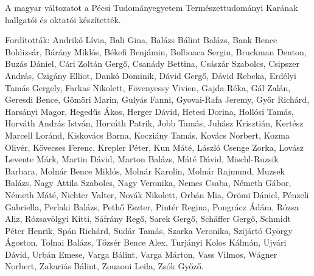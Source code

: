{
A magyar változatot a Pécsi Tudományegyetem Természettudományi Karának hallgatói és oktatói készítették.

Fordították:
Andrikó Lívia,
Bali Gina, Balázs Bálint Balázs, Bank Bence Boldizsár, Bárány Miklós,
Békefi Benjámin, Bolboaca Sergiu, Bruckman Denton, Buzás Dániel,
Cári Zoltán Gergő, Csanády Bettina, Császár Szabolcs, Csipszer András, Czigány Elliot,
Dankó Dominik, Dávid Gergő, Dávid Rebeka, Erdélyi Tamás Gergely,
Farkas Nikolett, Fövenyessy Vivien,
Gajda Réka, Gál Zalán, Geresdi Bence, Gömöri Marin, Gulyás Fanni, Gyovai-Rafa Jeremy, Győr Richárd,
Harsányi Magor, Hegedűs Ákos, Herger Dávid, Hetesi Dorina, Hollósi Tamás, Horváth András István, Horváth Patrik,
Jobb Tamás, Juhász Krisztián,
Kertész Marcell Loránd, Kiskovács Barna, Kocziány Tamás, Kovács Norbert, Kozma Olivér, Kövecses Ferenc, Krepler Péter, Kun Máté,
László Csenge Zorka, Lovász Levente Márk,
Martin Dávid, Marton Balázs, Máté Dávid, Mischl-Ruzsik Barbara, Molnár Bence Miklós, Molnár Karolin, Molnár Rajmund, Muzsek Balázs,
Nagy Attila Szabolcs, Nagy Veronika, Nemes Csaba, Németh Gábor, Németh Máté, Nichter Valter, Novák Nikolett,
Orbán Mia, Örömi Dániel,
Pénzeli Gabriella, Perlaki Balázs, Pethő Eszter, Pintér Regina, Pongrácz Ádám,
Rózsa Aliz, Rózsavölgyi Kitti,
Sáfrány Regő, Sarek Gergő, Schäffer Gergő, Schmidt Péter Henrik, Spán Richárd, Sudár Tamás,
Szarka Veronika, Szijártó György Ágoston,
Tolnai Balázs, Tőzsér Bence Alex, Turjányi Kolos Kálmán, Ujvári Dávid, Urbán Emese,
Varga Bálint, Varga Márton, Vass Vilmos, Wágner Norbert, Zakariás Bálint, Zouaoui Leila, Zsók Győző.
}